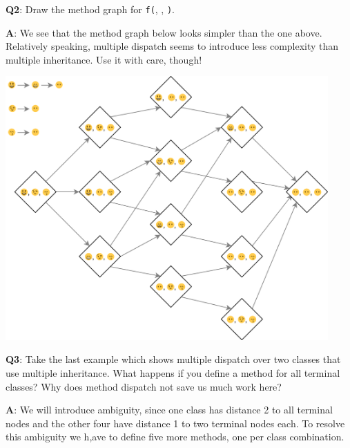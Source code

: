 \documentclass[
]{krantz}
\begin{document}
\textbf{{Q2}}: Draw the method graph for \texttt{f(}, , \texttt{)}.

\textbf{{A}}: We see that the method graph below looks simpler than the one above. Relatively speaking, multiple dispatch seems to introduce less complexity than multiple inheritance. Use it with care, though!

\begin{center}\includegraphics[width=350pt]{images/s4/method_dispatch2} \end{center}

\textbf{{Q3}}: Take the last example which shows multiple dispatch over two classes that use multiple inheritance. What happens if you define a method for all terminal classes? Why does method dispatch not save us much work here?

\textbf{{A}}: We will introduce ambiguity, since one class has distance 2 to all terminal nodes and the other four have distance 1 to two terminal nodes each. To resolve this ambiguity we h,ave to define five more methods, one per class combination.
\end{document}
